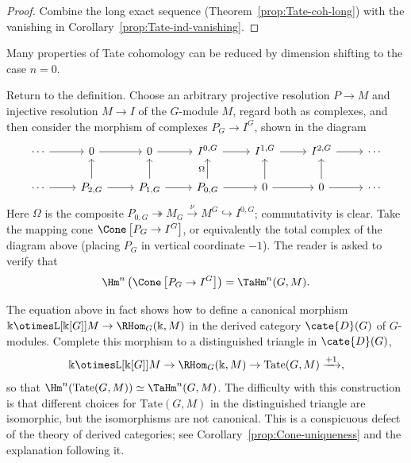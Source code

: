 \begin{proof}
	Combine the long exact sequence
	(Theorem~\ref{prop:Tate-coh-long}) with the vanishing in
	Corollary~\ref{prop:Tate-ind-vanishing}.
\end{proof}

Many properties of Tate cohomology can be reduced by dimension shifting to
the case $n=0$.

Return to the definition. Choose an arbitrary projective resolution $P\to M$
and injective resolution $M\to I$ of the $G$-module $M$, regard both as
complexes, and then consider the morphism of complexes $P_G\to I^G$, shown
in the diagram
\[\begin{tikzcd}
	\cdots \arrow[r] & 0 \arrow[r] & 0 \arrow[r] & I^{0, G} \arrow[r] & I^{1, G} \arrow[r] & I^{2, G} \arrow[r] & \cdots \\
	\cdots \arrow[r] & P_{2, G} \arrow[r] \arrow[u] & P_{1, G} \arrow[r] \arrow[u] & P_{0, G} \arrow[u, "\Omega"] \arrow[r] & 0 \arrow[r] \arrow[u] & 0 \arrow[r] \arrow[u] & \cdots
\end{tikzcd}\]
Here $\Omega$ is the composite
$P_{0,G}\twoheadrightarrow M_G\xrightarrow{\nu}M^G\hookrightarrow I^{0,G}$;
commutativity is clear. Take the mapping cone
$\Cone\left[P_G\to I^G\right]$, or equivalently the total complex of the
diagram above (placing $P_G$ in vertical coordinate $-1$). The reader is
asked to verify that
\begin{equation}\label{eqn:Tate-cone-1}
	\Hm^n\left( \Cone\left[P_G \to I^G\right] \right) = \TaHm^n(G, M).
\end{equation}

The equation above in fact shows how to define a canonical morphism
$\Bbbk \otimesL[{\Bbbk[G]}] M \to \RHom_G(\Bbbk, M)$ in the derived category
$\cate{D}(G)$ of $G$-modules. Complete this morphism to a distinguished
triangle in $\cate{D}(G)$,
\[ \Bbbk \otimesL[{\Bbbk[G]}] M \to \RHom_G(\Bbbk, M) \to \mathrm{Tate}(G, M) \xrightarrow{+1}, \]
so that $\Hm^n(\mathrm{Tate}(G,M))\simeq\TaHm^n(G,M)$. The difficulty with
this construction is that different choices for $\mathrm{Tate}(G,M)$ in the
distinguished triangle are isomorphic, but the isomorphisms are not
canonical. This is a conspicuous defect of the theory of derived categories;
see Corollary~\ref{prop:Cone-uniqueness} and the explanation following it.

